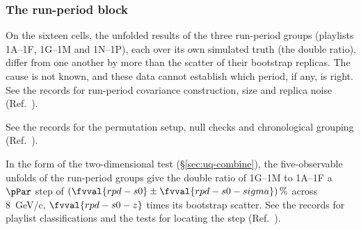 \subsubsection{The run-period block}
\label{sec:fived16-pl}
On the sixteen cells, the unfolded results of the three run-period groups (playlists 1A--1F, 1G--1M and 1N--1P), each over its own simulated truth (the double ratio), differ from one another by more than the scatter of their bootstrap replicas. The cause is not known, and these data cannot establish which period, if any, is right. See the records for run-period covariance construction, size and replica noise (Ref.~\cite{NoteRecords2026}).



See the records for the permutation setup, null checks and chronological grouping (Ref.~\cite{NoteRecords2026}).

In the form of the two-dimensional test (\S\ref{sec:uq-combine}), the five-observable unfolds of the run-period groups give the double ratio of 1G--1M to 1A--1F a $\pPar$ step of $(\fvval{rpd-s0}\pm\fvval{rpd-s0-sigma})\,\%$ across \SI{8}{GeV/c}, $\fvval{rpd-s0-z}$ times its bootstrap scatter. See the records for playlist classifications and the tests for locating the step (Ref.~\cite{NoteRecords2026}).

